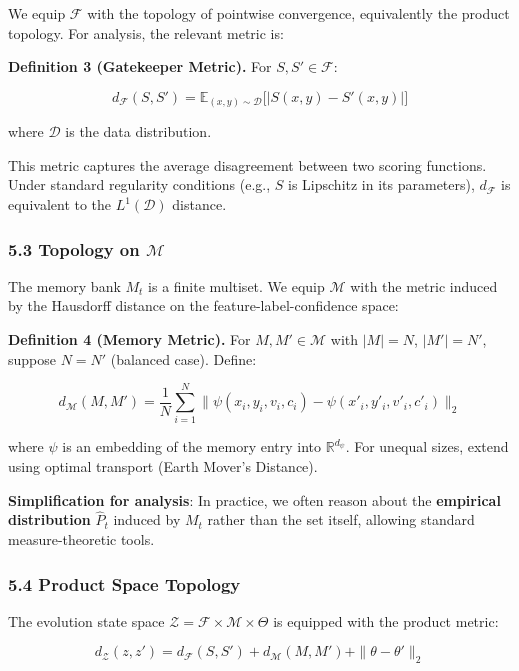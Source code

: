 \documentclass[
  12pt,
]{article}
\begin{document}
We equip \(\mathcal{F}\) with the topology of pointwise convergence,
equivalently the product topology. For analysis, the relevant metric is:

\textbf{Definition 3 (Gatekeeper Metric).} For
\(S, S' \in \mathcal{F}\):

\[d_{\mathcal{F}}(S, S') = \mathbb{E}_{(x,y) \sim \mathcal{D}}\bigl[ |S(x,y) - S'(x,y)| \bigr]\]

where \(\mathcal{D}\) is the data distribution.

This metric captures the average disagreement between two scoring
functions. Under standard regularity conditions (e.g., \(S\) is
Lipschitz in its parameters), \(d_{\mathcal{F}}\) is equivalent to the
\(L^1(\mathcal{D})\) distance.

\subsubsection{\texorpdfstring{5.3 Topology on
\(\mathcal{M}\)}{5.3 Topology on \textbackslash mathcal\{M\}}}\label{topology-on-mathcalm}

The memory bank \(M_t\) is a finite multiset. We equip \(\mathcal{M}\)
with the metric induced by the Hausdorff distance on the
feature-label-confidence space:

\textbf{Definition 4 (Memory Metric).} For \(M, M' \in \mathcal{M}\)
with \(|M| = N\), \(|M'| = N'\), suppose \(N = N'\) (balanced case).
Define:

\[d_{\mathcal{M}}(M, M') = \frac{1}{N} \sum_{i=1}^N \bigl\| \psi(x_i, y_i, v_i, c_i) - \psi(x'_i, y'_i, v'_i, c'_i) \bigr\|_2\]

where \(\psi\) is an embedding of the memory entry into
\(\mathbb{R}^{d_\psi}\). For unequal sizes, extend using optimal
transport (Earth Mover's Distance).

\textbf{Simplification for analysis}: In practice, we often reason about
the \textbf{empirical distribution} \(\hat{P}_t\) induced by \(M_t\)
rather than the set itself, allowing standard measure-theoretic tools.

\subsubsection{5.4 Product Space Topology}\label{product-space-topology}

The evolution state space
\(\mathcal{Z} = \mathcal{F} \times \mathcal{M} \times \Theta\) is
equipped with the product metric:

\[d_{\mathcal{Z}}(z, z') = d_{\mathcal{F}}(S, S') + d_{\mathcal{M}}(M, M') + \|\theta - \theta'\|_2\]
\end{document}
